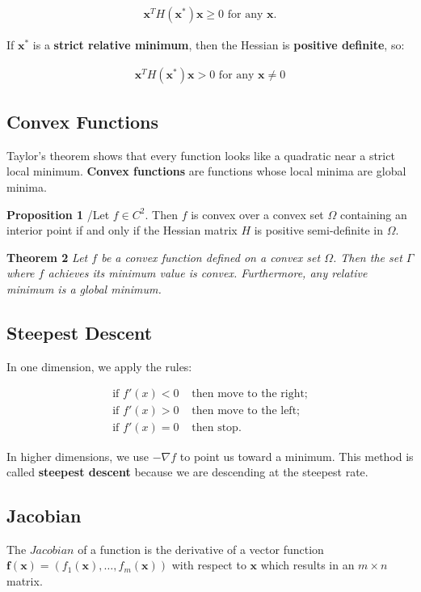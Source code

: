 \documentclass[11pt]{article}
\begin{document}
\begin{align*}
    \boldsymbol{x}^{T}H\left(\boldsymbol{x}^{*}\right)\boldsymbol{x} \geq 0 \text{ for any } \boldsymbol{x}.
\end{align*}

If \(\boldsymbol{x}^{*}\) is a \textbf{strict relative minimum}, then the Hessian is \textbf{positive definite}, so:

\begin{align*}
    \boldsymbol{x}^{T}H\left(\boldsymbol{x}^{*}\right)\boldsymbol{x} > 0 \text{ for any } \boldsymbol{x} \neq 0
\end{align*}

\subsection{Convex Functions}
\label{sec:org342d4a9}
Taylor's theorem shows that every function looks like a quadratic near a strict local minimum. \textbf{Convex functions} are functions whose local minima are global minima.

\textbf{Proposition 1} /Let \(f \in C^{2}\). Then \(f\) is convex over a convex set \(\Omega\) containing an interior point if and only if the Hessian matrix \(H\) is positive semi-definite in \(\Omega\).

\textbf{Theorem 2} \emph{Let \(f\) be a convex function defined on a convex set \(\Omega\). Then the set \(\Gamma\) where \(f\) achieves its minimum value is convex. Furthermore, any relative minimum is a global minimum.}

\subsection{Steepest Descent}
\label{sec:org3d75f99}
In one dimension, we apply the rules:

\begin{align*}
    \text{if } f'\left(x\right) < 0 &\text{ then move to the right;} \\
    \text{if } f'\left(x\right) > 0 &\text{ then move to the left;} \\
    \text{if } f'\left(x\right) = 0 &\text{ then stop.}
\end{align*}

In higher dimensions, we use \(-\nabla f\) to point us toward a minimum. This method is called \textbf{steepest descent} because we are descending at the steepest rate.

\subsection{Jacobian}
\label{sec:orgca8ed4c}
The \(Jacobian\) of a function is the derivative of a vector function \(\boldsymbol{f}\left(\boldsymbol{x}\right) = \left(f_{1}\left(\boldsymbol{x}\right), \ldots, f_{m}\left(\boldsymbol{x}\right)\right)\) with respect to \(\boldsymbol{x}\) which results in an \(m \times n\) matrix.
\end{document}
